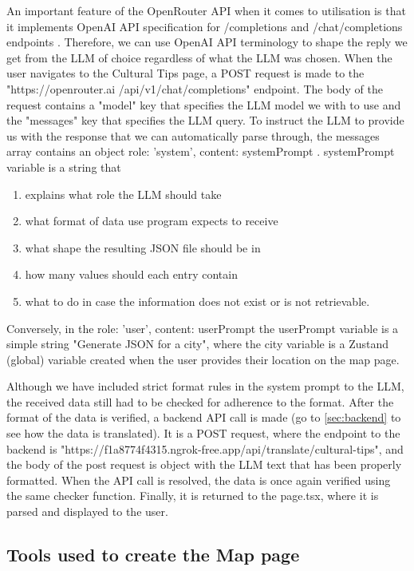An important feature of the OpenRouter API when it comes to utilisation is that it implements OpenAI API specification for /completions and /chat/completions endpoints \cite{noauthor_openrouter_nodate}. Therefore, we can use OpenAI API terminology \cite{openAI_explanation_onHowToUseTheirApi} to shape the reply we get from the LLM of choice regardless of what the LLM was chosen. When the user navigates to the Cultural Tips page, a POST request is made to the "https://openrouter.ai /api/v1/chat/completions" endpoint. The body of the request contains a "model" key that specifies the LLM model we with to use and the "messages" key that specifies the LLM query. To instruct the LLM to provide us with the response that we can automatically parse through, the messages array contains an object { role: 'system', content: systemPrompt }. systemPrompt variable is a string that 
\begin{enumerate} \itemsep0pt \parskip0pt
    \item explains what role the LLM should take
    \item what format of data use program expects to receive
    \item what shape the resulting JSON file should be in
    \item how many values should each entry contain
    \item what to do in case the information does not exist or is not retrievable.
\end{enumerate}
Conversely, in the { role: 'user', content: userPrompt } the userPrompt variable is a simple string "Generate JSON for a city", where the city variable is a Zustand (global) variable created when the user provides their location on the map page. 

Although we have included strict format rules in the system prompt to the LLM, the received data still had to be checked for adherence to the format. After the format of the data is verified, a backend API call is made (go to \autoref{sec:backend} to see how the data is translated). It is a POST request, where the endpoint to the backend is "https://f1a8774f4315.ngrok-free.app/api/translate/cultural-tips", and the body of the post request is object with the LLM text that has been properly formatted. When the API call is resolved, the data is once again verified using the same checker function. Finally, it is returned to the page.tsx, where it is parsed and displayed to the user.


\subsection{Tools used to create the Map page}

